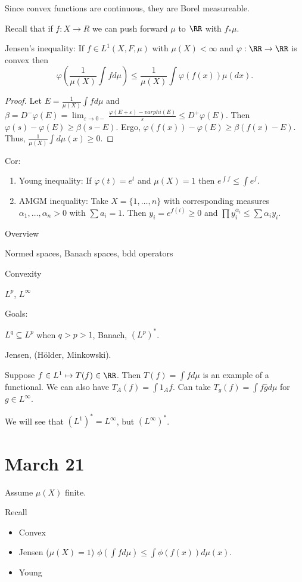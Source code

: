 \documentclass{../uva7310}
\begin{document}
Since convex functions are continuous, they are Borel measureable.

Recall that if $f:X\rightarrow R$ we can push forward $\mu$ to $\RR$ with $f_*\mu$.

Jensen's inequality: If $f\in L^1(X,F,\mu)$ with $\mu(X)<\infty$ and $\varphi:\RR\rightarrow\RR$ is convex then
\[
    \varphi\left(\frac{1}{\mu(X)}\int fd\mu\right)\leq \frac{1}{\mu(X)}\int \varphi(f(x))\mu(dx).
\]
\begin{proof}
    Let $E=\frac{1}{\mu(X)}\int fd\mu$ and $\beta=D^-\varphi(E)=\lim_{\varepsilon\to 0-}\frac{\varphi(E+\varepsilon)-varphi(E)}{\varepsilon}\leq D^+\varphi(E)$.
    Then $\varphi(s)-\varphi(E)\geq \beta(s-E)$. Ergo, $\varphi(f(x))-\varphi(E)\geq\beta(f(x)-E)$. Thus, $\frac{1}{\mu(X)}\int d\mu(x)\geq 0$.
\end{proof}

Cor:
\begin{enumerate}
    \item Young inequality: If $\varphi(t)=e^t$ and $\mu(X)=1$ then $e^{\int f}\leq \int e^f$.
    \item AMGM inequality: Take $X=\{1,\ldots, n\}$ with corresponding measures $\alpha_1,\ldots,\alpha_n>0$ with $\sum a_i=1$.
    Then $y_i=e^{f(i)}\geq 0$ and $\prod y_i^{\alpha_i} \leq \sum \alpha_i y_i$.
\end{enumerate}

Overview

Normed spaces, Banach spaces, bdd operators

Convexity

$L^p$, $L^\infty$

Goals:

$L^q\subseteq L^p$ when $q>p>1$, Banach, $(L^p)^*$.

Jensen, (H\"older, Minkowski).

Suppose $f\in L^1\mapsto T(f)\in\RR$. Then $T(f)=\int f d\mu$ is an example of a functional. We can also have $T_A(f)=\int 1_A f$.
Can take $T_g(f)=\int f\bar{g} d\mu$ for $g\in L^\infty$.

We will see that $(L^1)^*=L^\infty$, but $(L^\infty)^*$.

\section{March 21}

Assume $\mu(X)$ finite.

Recall
\begin{itemize}
    \item Convex
    \item Jensen ($\mu(X)=1$) $\phi(\int fd\mu)\leq \int\phi(f(x))d\mu(x)$.
    \item Young
\end{itemize}
\end{document}

